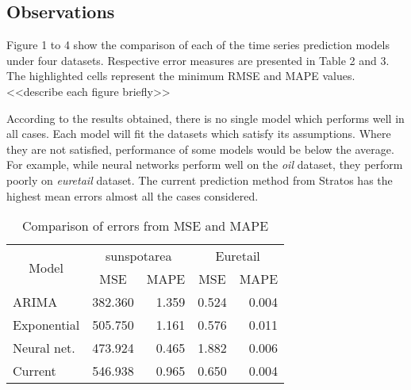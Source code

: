 \subsection{Observations}

Figure 1 to 4 show the comparison of each of the time series prediction models under four datasets. Respective error measures are presented in Table 2 and 3. The highlighted cells represent the minimum RMSE and MAPE values. 
<<describe each figure briefly>>

According to the results obtained, there is no single model which performs well in all cases. Each model will fit the datasets which satisfy its assumptions. Where they are not satisfied, performance of some models would be below the average. For example, while neural networks perform well on the \textit{oil} dataset, they perform poorly on \textit{euretail} dataset. The current prediction method from Stratos has the highest mean errors almost all the cases considered.

\begin{table}[]
\centering
\caption{Comparison of errors from MSE and MAPE}
\begin{tabular}{|l|l|r|r|r|}
\hline
\multicolumn{1}{|c|}{\multirow{2}{*}{Model}} & \multicolumn{2}{c|}{sunspotarea}                     & \multicolumn{2}{c|}{Euretail}                        \\ \cline{2-5} 
\multicolumn{1}{|c|}{}                       & \multicolumn{1}{c|}{MSE} & \multicolumn{1}{c|}{MAPE} & \multicolumn{1}{c|}{MSE} & \multicolumn{1}{c|}{MAPE} \\ \hline
ARIMA                                        & 382.360                & 1.359                   & 0.524                  & 0.004                   \\ \hline
Exponential                                  & 505.750                & 1.161                   & 0.576                  & 0.011                   \\ \hline
Neural net.                                  & 473.924                & 0.465                   & 1.882                  & 0.006                   \\ \hline
Current                                      & 546.938                & 0.965                   & 0.650                  & 0.004                   \\ \hline
\end{tabular}
\end{table}

